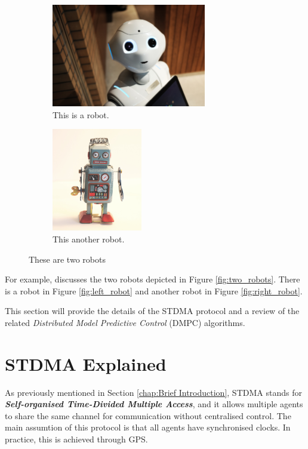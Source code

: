 {\begin{figure}[htb]
\centering
\begin{subfigure}[t]{.5\textwidth}
  \centering
  \includegraphics[height=4.5cm]{figures/Robot_1.jpg}
  \caption{\label{fig:left_robot} This is a robot.}
  \label{fig:theoretical}
\end{subfigure}%
\begin{subfigure}[t]{.5\textwidth}
  \centering
  \includegraphics[height=4.5cm]{figures/Robot_2.jpg}
  \caption{\label{fig:right_robot} This another robot.}
  \label{fig:practical}
\end{subfigure}
\caption{\label{fig:two_robots} These are two robots}
\label{fig:test}
\end{figure}

For example, \cite{Robots2020} discusses the two robots depicted in Figure \ref{fig:two_robots}. There is a robot in Figure \ref{fig:left_robot} and another robot in Figure \ref{fig:right_robot}.

}

This section will provide the details of the STDMA\cite{STDMA} protocol and a review of the related \textit{Distributed Model Predictive Control} (DMPC) algorithms.

\section{STDMA Explained}

As previously mentioned in Section \ref{chap:Brief Introduction}, STDMA stands for \textbf{\textit{Self-organised Time-Divided Multiple Access}}, and it allows multiple agents to share the same channel for communication without centralised control.
The main assumtion of this protocol is that all agents have synchronised clocks. In practice, this is achieved through GPS\cite{STDMA_GPS}.


